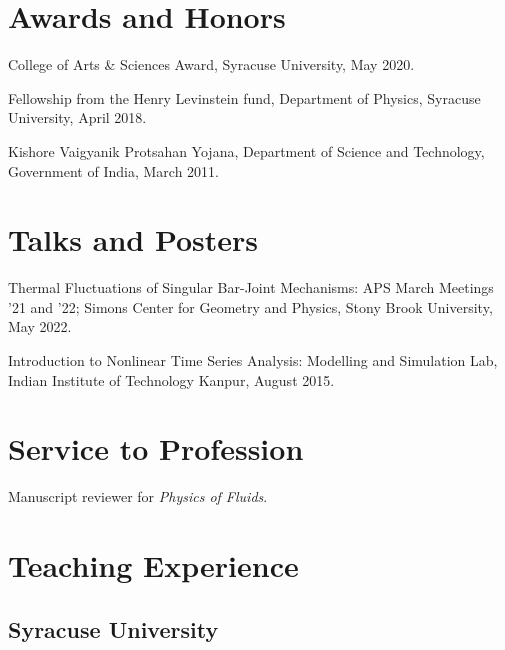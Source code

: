 \documentclass[10pt,article,oneside]{memoir}
\def\nohangpars{%
  \leftskip=0pt%
  \parindent=0pt%
  \setsecindent{0pt}%
  \setsubsecindent{0pt}%
}
\begin{document}


\section{Awards and Honors}

College of Arts \& Sciences Award, Syracuse University, May 2020.

Fellowship from the Henry Levinstein fund, Department of Physics, Syracuse University, April 2018.

Kishore Vaigyanik Protsahan Yojana, Department of Science and Technology, Government of India, March 2011.


\section{Talks and Posters}

Thermal Fluctuations of Singular Bar-Joint Mechanisms: APS March Meetings '21 and '22; Simons Center for Geometry and Physics, Stony Brook University, May 2022.

Introduction to Nonlinear Time Series Analysis: Modelling and Simulation Lab, Indian Institute of Technology Kanpur, August 2015.


\nohangpars

\section{Service to Profession}

Manuscript reviewer for \emph{Physics of Fluids}.


\section{Teaching Experience}

\subsection{Syracuse University}
\end{document}
